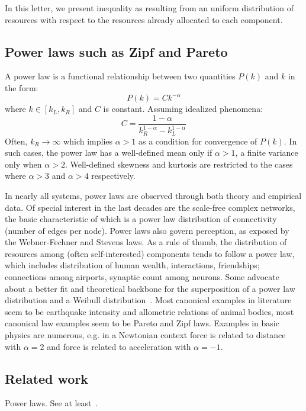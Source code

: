 \documentclass[a4paper, 11pt]{article} %
\begin{document}
In this letter, we present inequality as resulting from
an uniform distribution of resources with
respect to the resources already allocated to each component.


\subsection{Power laws such as Zipf and Pareto}
A power law is a functional relationship between two quantities $P(k)$ and $k$ in the form:
\begin{equation}
P(k) = Ck^{-\alpha}
\end{equation}
\noindent where $k\in [k_L,k_R]$
and $C$ is constant.
Assuming idealized phenomena:
\begin{equation}
C=\frac{1-\alpha}{k_R^{1-\alpha}-k_L^{1-\alpha}}
\end{equation}
\noindent Often, $k_R\rightarrow \infty$ which implies $\alpha>1$ as a condition for convergence of $P(k)$.
In such cases, the power law has a well-defined mean only if $\alpha>1$,
a finite variance only when $\alpha>2$. Well-defined skewness and kurtosis are restricted
to the cases where $\alpha>3$ and $\alpha>4$ respectively.

In nearly all systems, power laws are observed through both theory and empirical data.
Of special interest in the last decades are the scale-free complex networks,
the basic characteristic of which is a power law distribution of connectivity (number of edges per node).
Power laws also govern perception, as exposed by the Webner-Fechner and Stevens laws.
As a rule of thumb, the distribution of resources among (often self-interested) components
tends to follow a power law,
which includes distribution of human wealth, interactions, friendships;
connections among airports, synaptic count among neurons.
Some advocate 
about a better fit and theoretical backbone for the superposition of a
 power law distribution and a Weibull distribution~\cite{powWeib}.
 Most canonical examples in literature seem to be earthquake intensity and allometric relations of animal bodies,
 most canonical law examples seem to be Pareto and Zipf laws.
 Examples in basic physics are numerous, e.g. in a Newtonian context force is related to distance with $\alpha=2$ and force is related to acceleration with $\alpha=-1$.

\subsection{Related work}
Power laws. See at least~\cite{part,pbook}.
\end{document}

